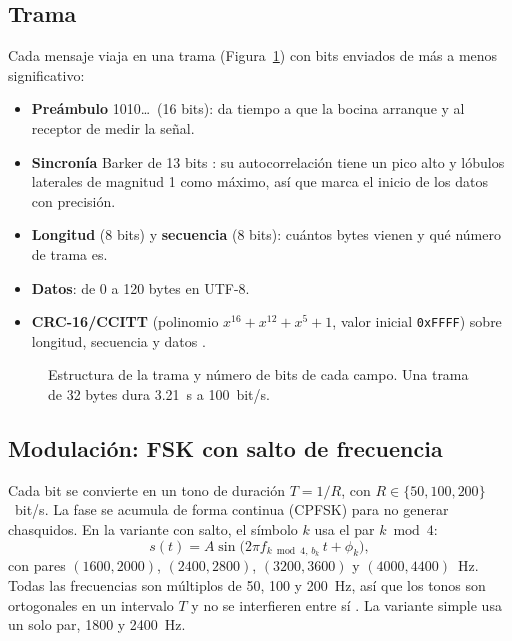 \documentclass[10pt,twocolumn,letterpaper]{article}
\begin{document}
\subsection{Trama}
Cada mensaje viaja en una trama (Figura~\ref{fig:trama}) con bits enviados de más a menos significativo:
\begin{itemize}
\item \textbf{Preámbulo} 1010\ldots\ (16 bits): da tiempo a que la bocina arranque y al receptor de medir la señal.
\item \textbf{Sincronía} Barker de 13 bits \cite{barker}: su autocorrelación tiene un pico alto y lóbulos laterales de magnitud 1 como máximo, así que marca el inicio de los datos con precisión.
\item \textbf{Longitud} (8 bits) y \textbf{secuencia} (8 bits): cuántos bytes vienen y qué número de trama es.
\item \textbf{Datos}: de 0 a 120 bytes en UTF-8.
\item \textbf{CRC-16/CCITT} (polinomio $x^{16}+x^{12}+x^5+1$, valor inicial \texttt{0xFFFF}) sobre longitud, secuencia y datos \cite{peterson}.
\end{itemize}

\begin{figure}[h]
\centering
{}
\caption{Estructura de la trama y número de bits de cada campo. Una trama de 32 bytes dura 3.21~s a 100~bit/s.}\label{fig:trama}
\end{figure}

\subsection{Modulación: FSK con salto de frecuencia}
Cada bit se convierte en un tono de duración $T = 1/R$, con $R \in \{50, 100, 200\}$~bit/s. La fase se acumula de forma continua (CPFSK) para no generar chasquidos. En la variante con salto, el símbolo $k$ usa el par $k \bmod 4$:
\begin{equation}
s(t) = A\sin\!\big(2\pi f_{k \bmod 4,\,b_k}\, t + \phi_k\big),
\end{equation}
con pares $(1600, 2000)$, $(2400, 2800)$, $(3200, 3600)$ y $(4000, 4400)$~Hz. Todas las frecuencias son múltiplos de 50, 100 y 200~Hz, así que los tonos son ortogonales en un intervalo $T$ y no se interfieren entre sí \cite{sklar}. La variante simple usa un solo par, 1800 y 2400~Hz.
\end{document}
